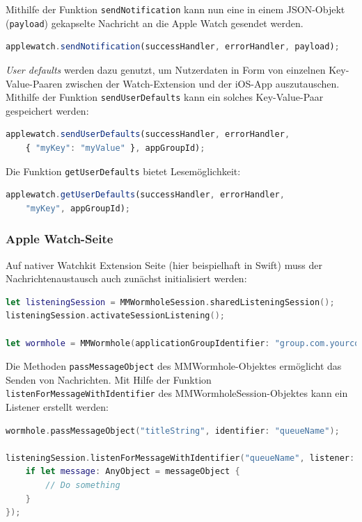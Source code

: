 Mithilfe der Funktion \texttt{sendNotification} kann nun eine in einem JSON-Objekt (\texttt{payload}) gekapselte Nachricht an die Apple Watch gesendet werden.  
\begin{lstlisting}[language=JavaScript]
applewatch.sendNotification(successHandler, errorHandler, payload);
\end{lstlisting}

\emph{User defaults} werden dazu genutzt, um Nutzerdaten in Form von einzelnen Key-Value-Paaren zwischen der Watch-Extension und der iOS-App auszutauschen. Mithilfe der Funktion \texttt{sendUserDefaults} kann ein solches Key-Value-Paar gespeichert werden:
\begin{lstlisting}[language=JavaScript, breaklines=true]
applewatch.sendUserDefaults(successHandler, errorHandler, 
    { "myKey": "myValue" }, appGroupId);
\end{lstlisting}
Die Funktion \texttt{getUserDefaults} bietet Lesemöglichkeit:
\begin{lstlisting}[language=JavaScript]
applewatch.getUserDefaults(successHandler, errorHandler, 
    "myKey", appGroupId);
\end{lstlisting}
%
%
%
\subsubsection{Apple Watch-Seite}
Auf nativer Watchkit Extension Seite (hier beispielhaft in Swift) muss der Nachrichtenaustausch auch zunächst initialisiert werden:
\begin{lstlisting}[language=swift, breaklines=true]
let listeningSession = MMWormholeSession.sharedListeningSession();
listeningSession.activateSessionListening();

let wormhole = MMWormhole(applicationGroupIdentifier: "group.com.yourcompany", optionalDirectory: nil, transitingType: .SessionContext);
\end{lstlisting}

Die Methoden \texttt{passMessageObject} des MMWormhole-Objektes ermöglicht das Senden von Nachrichten. Mit Hilfe der Funktion \texttt{listenForMessageWithIdentifier} des MMWormholeSession-Objektes kann ein Listener erstellt werden:
\begin{lstlisting}[language=swift, breaklines=true]
wormhole.passMessageObject("titleString", identifier: "queueName");

listeningSession.listenForMessageWithIdentifier("queueName", listener: { (messageObject) -> Void in
    if let message: AnyObject = messageObject {
        // Do something
    }
});
\end{lstlisting}

